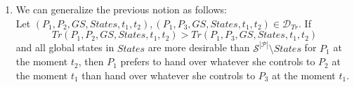 \begin{enumerate}
      \item We can generalize the previous notion as follows: \\ Let $\left(P_1, P_2, GS, States, t_1, t_2\right), \left(P_1,
      P_3, GS, States, t_1, t_2\right) \in \mathcal{D}_{Tr}$. If
      \begin{equation*}
        Tr\left(P_1, P_2, GS, States, t_1, t_2\right) > Tr\left(P_1, P_3, GS, States, t_1, t_2\right)
      \end{equation*}
      and all global states in $States$ are more desirable than $\mathcal{S}^{|\mathcal{P}|} \setminus States$ for $P_1$ at
      the moment $t_2$, then $P_1$ prefers to hand over whatever she controls to $P_2$ at the moment $t_1$ than hand over
      whatever she controls to $P_3$ at the moment $t_1$.
    \end{enumerate}
